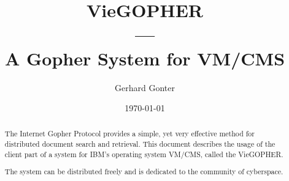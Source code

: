 
%
%
%
%
\pagestyle{headings}








\thispagestyle{empty}
\title{VieGOPHER\\---\\A Gopher System for VM/CMS}
\author{Gerhard Gonter}
\date{\today}
\maketitle

\begin{abstract}
The Internet Gopher Protocol provides a simple, yet very effective
method for distributed document search and retrieval.
This document describes the usage of the client part of a
system for IBM's operating system VM/CMS, called the VieGOPHER.

The system can be distributed freely and is dedicated to the community
of cyberspace.
\end{abstract}

\tableofcontents
\listoftables
\listoffigures

\newcommand{\SUBsection}[1]{\section{#1}}
\newcommand{\SUBsubsection}[1]{\subsection{#1}}

